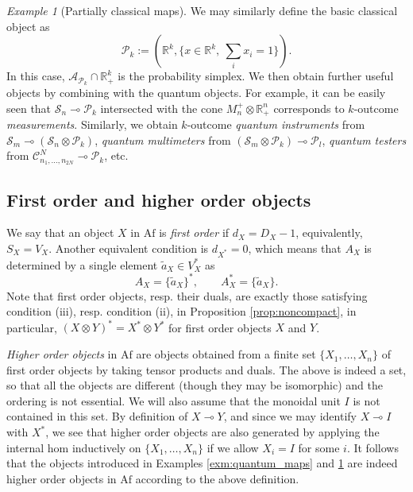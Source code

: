 \documentclass[12pt]{article}
\theoremstyle{definition}
\theoremstyle{remark}
\newtheorem{exm}{Example}
\def\Ce{\mathcal C}
\def\Pe{\mathcal P}
\def\Se {\mathcal S}
\def \Af{\mathrm{Af}}
\begin{document}
\begin{exm}[Partially classical maps]\label{exm:quantum_classical}  We may similarly define the basic
classical object as 
\[
\Pe_k:=(\mathbb R^k, \{x\in \mathbb R^k,\ \sum_i x_i=1\}).
\]
In this case, $\mathcal A_{\Pe_k}\cap \mathbb R^k_+$ is the probability simplex. We then
obtain further  useful objects by combining with the quantum objects. For example, it can be
easily seen that $\Se_n\multimap \Pe_k$ intersected with the cone $M_n^+\otimes \mathbb R^n_+$
corresponds to $k$-outcome {\em measurements}. Similarly, we obtain $k$-outcome {\em quantum instruments}
 from $\Se_m\multimap (\Se_n\otimes \Pe_k)$, {\em quantum multimeters} from $(\Se_m\otimes
\Pe_k)\multimap \Pe_l$, {\em quantum testers} from  $\Ce^N_{n_1,\dots,n_{2N}}\multimap
\Pe_k$, etc. 

\end{exm}




\subsection{First order and higher order objects}


We say that an object $X$ in $\Af$ is {\em first order} if $d_X=D_X-1$, equivalently, $S_X=V_X$.
Another equivalent condition is $d_{X^*}=0$, which means that $A_X$ is determined by a
single element $\tilde a_X\in V_X^*$ as 
\[
A_X=\{\tilde a_X\}^*,\qquad A^*_X=\{\tilde a_X\}.
\]
Note that first order objects, resp. their duals, are exactly those satisfying
condition (iii), resp. condition (ii), in Proposition \ref{prop:noncompact}, in
particular, $(X\otimes Y)^*=X^*\otimes Y^*$ for first order objects $X$ and $Y$.


{\em Higher order objects} in $\Af$ are objects  obtained from a finite set $\{X_1,\dots,X_n\}$ of first order objects by
taking tensor products and duals. The above is indeed a set, so that all the objects are
different (though they may be isomorphic) and the ordering is not essential. We will also
assume that the monoidal  unit $I$ is not contained in this set. By definition of
$X\multimap Y$,
and since we may identify $X\multimap I$ with $X^*$, we see that higher order objects are
also generated by applying the internal hom inductively on $\{X_1,\dots, X_n\}$ if we allow $X_i=I$ for some  
$i$. It follows that the objects introduced  in Examples \ref{exm:quantum_maps} and
\ref{exm:quantum_classical}
are indeed higher order objects in $\Af$  according to the above definition.
\end{document}
